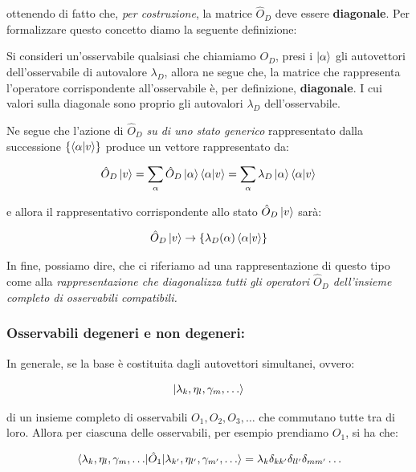	ottenendo di fatto che, \textit{per costruzione}, la matrice $\hat{O}_D$ deve essere \textbf{diagonale}. Per formalizzare questo concetto diamo la seguente definizione:
	
\begin{mydef}
	Si consideri un'osservabile qualsiasi che chiamiamo $O_D$, presi i $\ket{\alpha}$ gli autovettori dell'osservabile di autovalore $\lambda_D$, allora ne segue che, la matrice che rappresenta l'operatore corrispondente all'osservabile è, per definizione, \textbf{diagonale}. I cui valori sulla diagonale sono proprio gli autovalori $\lambda_D$ dell'osservabile.
\end{mydef}
	
	Ne segue che l'azione di $\hat{O}_D$ \textit{su di uno stato generico} rappresentato dalla successione $\{\braket{\alpha}{v}\}$ produce un vettore rappresentato da:
	
\begin{align*}
	\hat{O}_D \ket{v} =\sum_{\alpha} \hat{O}_D \ket{\alpha} \braket{\alpha}{v} = \sum_{\alpha} \lambda_D \ket{\alpha} \braket{\alpha}{v}
\end{align*}

	e allora il rappresentativo corrispondente allo stato $\hat{O}_D \ket{v}$ sarà:
	
\begin{align*}
	\hat{O}_D\ket{v} \to \{\lambda_D\qty(\alpha) \braket{\alpha}{v}\}
\end{align*}
	
	In fine, possiamo dire, che ci riferiamo ad una rappresentazione di questo tipo come alla \textit{rappresentazione che diagonalizza tutti gli operatori $\hat{O}_D$ dell'insieme completo di osservabili compatibili.}
	
\subsubsection{Osservabili degeneri e non degeneri:}
	
	In generale, se la base è costituita dagli autovettori simultanei, ovvero:
	
\begin{align*}
	\ket{\lambda_k, \eta_l, \gamma_m, \ldots}
\end{align*}
	
	di un insieme completo di osservabili $O_1, O_2, O_3, \ldots$ che commutano tutte tra di loro. Allora per ciascuna delle osservabili, per esempio prendiamo $O_1$, si ha che:
	
\begin{align*}
	\mel{\lambda_k,\eta_l, \gamma_m, \ldots }{\hat{O}_1}{\lambda_{k'}, \eta_{l'}, \gamma_{m'}, \ldots} = \lambda_k \delta_{kk'} \delta_{ll'} \delta_{mm'} \ldots
\end{align*}

